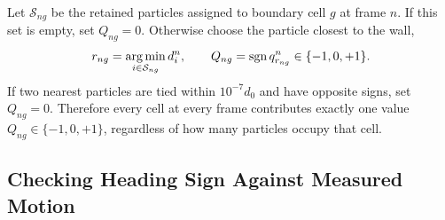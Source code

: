 \documentclass[11pt]{article}
\numberwithin{equation}{section}
\begin{document}
Let $\mathcal S_{ng}$ be the retained particles assigned to boundary cell $g$
at frame $n$.  If this set is empty, set $Q_{ng}=0$.  Otherwise choose the
particle closest to the wall,
\begin{equation}
  r_{ng}=\mathop{\rm arg\,min}_{i\in\mathcal S_{ng}}d_i^n,
  \qquad
  Q_{ng}=\operatorname{sgn}q_{r_{ng}}^n
  \in\{-1,0,+1\}.
  \label{eq:boundary_frame_representative}
\end{equation}
If two nearest particles are tied within $10^{-7}d_0$ and have opposite signs,
set $Q_{ng}=0$.  Therefore every cell at every frame contributes exactly one
value $Q_{ng}\in\{-1,0,+1\}$, regardless of how many particles occupy that
cell.

\subsection{Checking Heading Sign Against Measured Motion}
\end{document}
